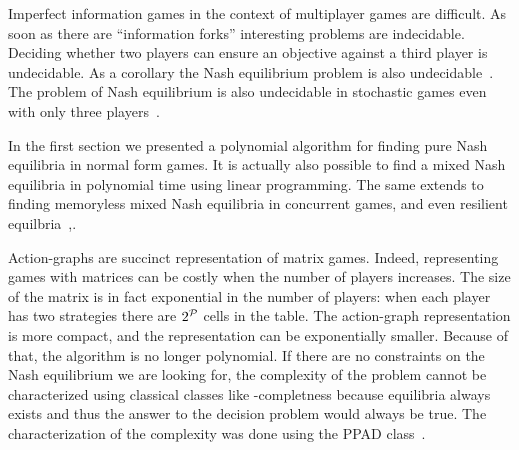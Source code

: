 Imperfect information games in the context of multiplayer games are difficult.
As soon as there are ``information forks'' interesting problems are indecidable.
Deciding whether two players can ensure an objective against a third player
is undecidable.
As a corollary the Nash equilibrium problem is also undecidable~\cite{Pnueli&Rosner:1990}.
The problem of Nash equilibrium is also undecidable in stochastic games even
with only three players~\cite{Bouyer&Markey&Stan:2014}.

In the first section we presented a polynomial algorithm for
finding pure Nash equilibria in normal form games.
It is actually also possible to find a mixed Nash equilibria in
polynomial time using linear programming.
The same extends to finding memoryless mixed Nash equilibria in concurrent
games, and even resilient equilbria~\cite{Brenguier:2016},.

Action-graphs are succinct representation of matrix games. Indeed,
representing games with matrices can be costly when the number of
players increases. The size of the matrix is in fact exponential in the
number of players: when each player has two strategies there are
\(2^{\mathcal{P}}\) cells in the table.
The action-graph representation is more compact, and the representation can be
exponentially smaller.
Because of that, the algorithm is no longer polynomial.
If there are no constraints on the Nash equilibrium we are looking for, the
complexity of the problem cannot be characterized using classical classes
like \NP-completness because equilibria always
exists and thus the answer to the decision problem would always be true.
The characterization of the complexity was done using the PPAD class~\cite{Daskalakis&Goldberg&Papadimitriou:2009}.

